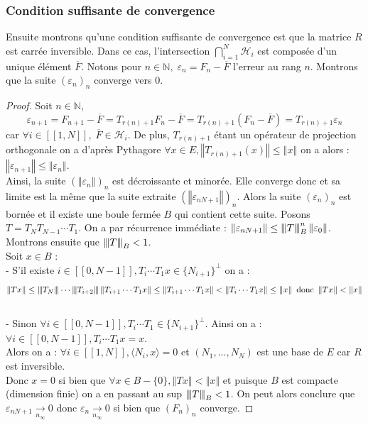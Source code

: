 \documentclass{article}
\newcommand*{\iintervalle}[2]{[\![#1,#2]\!]}
\newcommand*{\N}{\mathbb{N}}
\newcommand*{\scal}[2]{\langle #1, #2 \rangle}
\newcommand*{\norme}[1]{\left \Vert #1 \right \Vert}
\newcommand*{\normet}[1]{\left\vert\kern-0.25ex\left\vert\kern-0.25ex\left\vert #1 
\right\vert\kern-0.25ex\right\vert\kern-0.25ex\right\vert}
\let \epsilon \varepsilon
\theoremstyle{definition}
\theoremstyle{remark}
\theoremstyle{plain}
\theoremstyle{definition}
\begin{document}
\subsubsection*{Condition suffisante de convergence} 
Ensuite montrons qu'une condition suffisante de convergence est que la matrice $R$ est carrée inversible. Dans ce cas, l'intersection $\bigcap_{i = 1 }^N \mathcal{H}_i$ est composée d'un unique élément $\overline{F}$. Notons pour $n\in \N, \; \epsilon_n = F_n - \overline{F}$ l'erreur au rang $n$. Montrons que la suite $(\epsilon_n)_n$ converge vers $0$. 
\begin{proof}
    Soit $n\in \N$, $$\epsilon_{n+1} = F_{n+1} - \overline{F} = T_{r(n)+1}F_n - \overline{F} = T_{r(n)+1}(F_n - \overline{F}) = T_{r(n)+1}\epsilon_n$$
    car $\forall i \in \iintervalle{1}{N},\; \overline{F} \in \mathcal{H}_i$. 
    De plus, $T_{r(n) + 1}$ étant un opérateur de projection orthogonale on a d'après Pythagore $\forall x \in E, \norme{T_{r(n)+1}(x)} \leq \norme{x}$ on a alors : $\norme{\epsilon_{n+1}} \le \norme{\epsilon_n}$.\\
    Ainsi, la suite $(\norme{\epsilon_n})_n$ est décroissante et minorée. Elle converge donc et sa limite est la même que la suite extraite $(\norme{\epsilon_{nN+1}})_n$. Alors la suite $(\epsilon_n)_n$ est bornée et il existe une boule fermée $B$ qui contient cette suite. 
    Posons $T = T_N T_{N-1}\cdots T_1$. On a par récurrence immédiate : $\norme{\epsilon_{nN+1}} \le \normet{T}^n_B \norme{\epsilon_0}$.\\
    Montrons ensuite que $\normet{T}_B < 1$. \\
    Soit $x \in B$ : \\
    - S'il existe $i \in \iintervalle{0}{N-1}, T_i \cdots T_1 x \in \{N_{i+1}\}^{\perp}$ on a : 
    $$\norme{Tx} \le \normet{T_N} \cdots \normet{T_{i+2}}\norme{T_{i+1} \cdots T_1 x} \le \norme{T_{i+1} \cdots T_1 x} < \norme{T_{i} \cdots T_1 x} \le \norme{x} \text{ donc } \norme{Tx} < \norme{x}$$\\
    - Sinon $\forall i \in \iintervalle{0}{N-1}, T_i \cdots T_1 \in \{N_{i+1}\}^{\perp}$. Ainsi on a : $\forall i \in \iintervalle{0}{N-1}, T_i \cdots T_1 x = x$. \\
    Alors on a :
    $\forall i \in \iintervalle{1}{N}, \scal{N_i}{x} = 0$ et $(N_1, ... , N_N)$ est une base de $E$ car $R$ est inversible.\\ Donc $x = 0$
    si bien que $\forall x \in B - \{0\}, \norme{Tx} < \norme{x}$ et puisque $B$ est compacte (dimension finie) on a en passant au sup $\normet{T}_B < 1$. On peut alors conclure que $\epsilon_{nN+1} \underset{n_{\infty}}{\longrightarrow} 0$ donc $\epsilon_n \underset{n_{\infty}}{\longrightarrow} 0$ si bien que $(F_n)_n$ converge. 
\end{proof}
\end{document}
